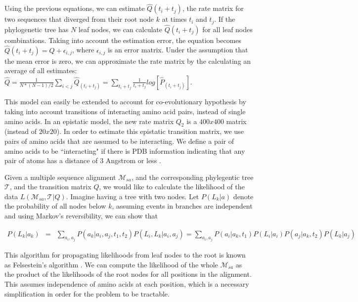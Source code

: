 Using the previous equations, we can estimate $\hat{Q}(t_i+t_j)$, the rate matrix for two sequences that diverged from their root node $k$ at times $t_i$ and $t_j$. If the phylogenetic tree has $N$ leaf nodes, we can calculate $\hat{Q}(t_i+t_j)$ for all leaf nodes combinations. Taking into account the estimation error, the equation becomes $\hat{Q}(t_i+t_j) = Q + \epsilon_{i,j}$, where $\epsilon_{i,j}$ is an error matrix. Under the assumption that the mean error is zero, we can approximate the rate matrix by the calculating an average of all estimates: $\hat{Q} = \frac{1}{N * (N-1)/2} \sum_{i < j} \hat{Q}_(t_i+t_j) = \sum_{t_i+t_j} \frac{1}{t_i+t_j} log[ \hat{P}_(t_i+t_j) ]$.

This model can easily be extended to account for co-evolutionary hypothesis by taking into account transitions of interacting amino acid pairs, instead of single amino acids. In an epistatic model, the new rate matrix $Q_2$ is a $400x400$ matrix (instead of $20x20$). In order to estimate this epistatic transition matrix, we use pairs of amino acids that are assumed to be interacting. We define a pair of amino acids to be ``interacting" if there is PDB information indicating that any pair of atoms has a distance of 3 Angstrom or less \cite{burger2010disentangling}.

Given a multiple sequence alignment $\mathcal{M}_{sa}$, and the corresponding phylegentic tree $\mathcal{T}$, and the transition matrix $Q$, we would like to calculate the likelihood of the data $L(\mathcal{M}_{sa}, \mathcal{T} | Q)$. Imagine having a tree with two nodes. Let $P(L_k|a)$ denote the probability of all nodes below $k$, assuming events in branches are independent and using Markov's reversibility, we can show that \cite{durbin1998biological}

\begin{eqnarray*}
P(L_k |  a_k ) 
& = & \sum_{a_i, a_j}{ P(a_k | a_i, a_j, t_1, t_2) P(L_i, L_k | a_i, a_j)  }
= \sum_{a_i, a_j}{ P(a_i | a_k, t_1) P(L_i | a_i ) P(a_j | a_k, t_2) P( L_k | a_j) }
\end{eqnarray*}

This algorithm for propagating likelihoods from leaf nodes to the root is known as Felsestein's algorithm \cite{felsenstein2004inferring}. We can compute the likelihood of the whole $\mathcal{M}_{sa}$ as the product of the likelihoods of the root nodes for all positions in the alignment. This assumes independence of amino acids at each position, which is a necessary simplification in order for the problem to be tractable.

